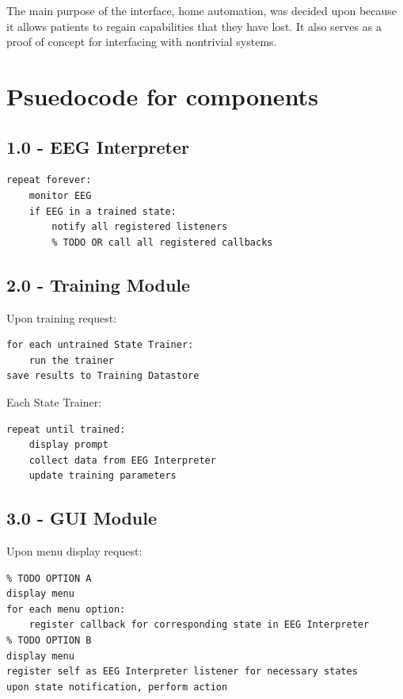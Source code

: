 \documentclass{article}
\begin{document}
The main purpose of the interface, home automation, was decided upon because
it allows patients to regain capabilities that they have lost. It also
serves as a proof of concept for interfacing with nontrivial systems.

\newpage

\section{Psuedocode for components}

\subsection*{1.0 - EEG Interpreter}


\begin{lstlisting}
repeat forever:
    monitor EEG
    if EEG in a trained state:
        notify all registered listeners
        % TODO OR call all registered callbacks
\end{lstlisting}

\subsection*{2.0 - Training Module}

Upon training request:

\begin{lstlisting}
for each untrained State Trainer:
    run the trainer
save results to Training Datastore
\end{lstlisting}

Each State Trainer:

\begin{lstlisting}
repeat until trained:
    display prompt
    collect data from EEG Interpreter
    update training parameters
\end{lstlisting}

\subsection*{3.0 - GUI Module}

Upon menu display request:
\begin{lstlisting}
% TODO OPTION A
display menu
for each menu option:
    register callback for corresponding state in EEG Interpreter
% TODO OPTION B
display menu
register self as EEG Interpreter listener for necessary states
upon state notification, perform action
\end{lstlisting}
\end{document}
